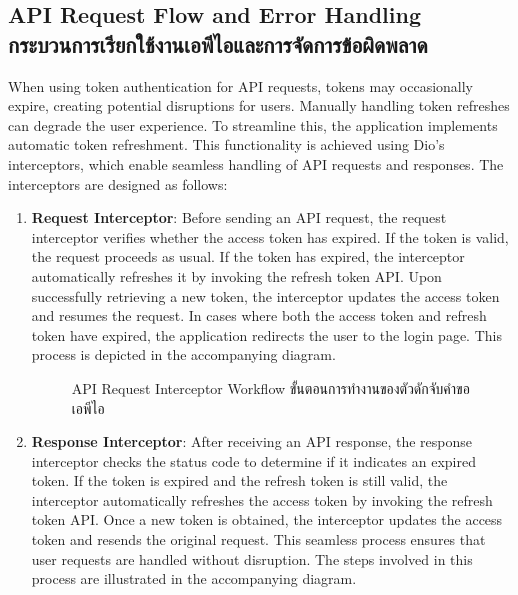 \subsection{\ifenglish API Request Flow and Error Handling \else กระบวนการเรียกใช้งานเอพีไอและการจัดการข้อผิดพลาด \fi}
When using token authentication for API requests, tokens may occasionally expire, creating potential disruptions for users. Manually handling token refreshes can degrade the user experience. To streamline this, the application implements automatic token refreshment. This functionality is achieved using Dio’s interceptors, which enable seamless handling of API requests and responses. The interceptors are designed as follows:
\begin{enumerate}
    \item \textbf{Request Interceptor}: Before sending an API request, the request interceptor verifies whether the access token has expired. If the token is valid, the request proceeds as usual. If the token has expired, the interceptor automatically refreshes it by invoking the refresh token API. Upon successfully retrieving a new token, the interceptor updates the access token and resumes the request. In cases where both the access token and refresh token have expired, the application redirects the user to the login page. This process is depicted in the accompanying diagram.  
    
    \begin{figure}[ht]
        \begin{center}
        
        \end{center}
        \newcommand{\RequestInterceptor}{\ifenglish API Request Interceptor Workflow \else ขั้นตอนการทำงานของตัวดักจับคำขอเอพีไอ\fi}
        \caption[\RequestInterceptor]{\RequestInterceptor}
        \label{fig:mobile app request interceptor}
    \end{figure}

    \item \textbf{Response Interceptor}: After receiving an API response, the response interceptor checks the status code to determine if it indicates an expired token. If the token is expired and the refresh token is still valid, the interceptor automatically refreshes the access token by invoking the refresh token API. Once a new token is obtained, the interceptor updates the access token and resends the original request. This seamless process ensures that user requests are handled without disruption. The steps involved in this process are illustrated in the accompanying diagram.      
\end{enumerate}
